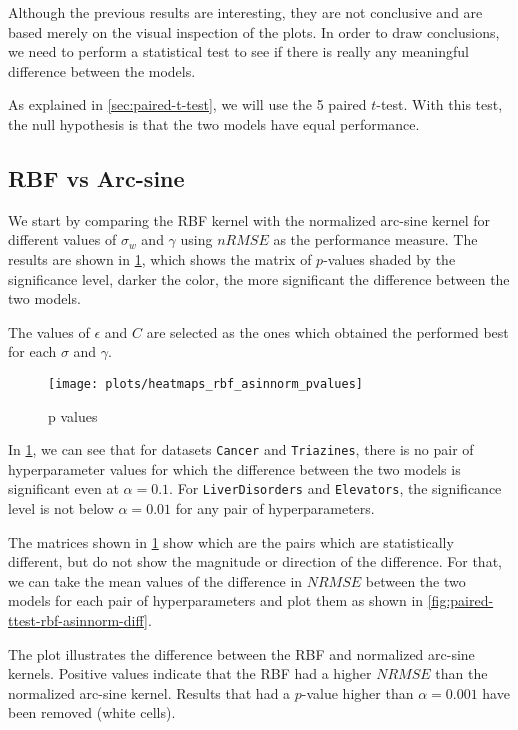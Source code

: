 Although the previous results are interesting, they are not conclusive and
are based merely on the visual inspection of the plots. In order to draw
conclusions, we need to perform a statistical test to see if there is
really any meaningful difference between the models.

As explained in \cref{sec:paired-t-test}, we will use the 5
paired $t$-test. With this test, the null hypothesis is that the two models
have equal performance.

\subsection{RBF vs Arc-sine}

We start by comparing the RBF kernel with the normalized arc-sine kernel for
different values of $\sigma_w$ and $\gamma$ using $nRMSE$ as the performance
measure. The results are shown in \cref{fig:paired-ttest-rbf-asinnorm},
which shows the matrix of $p$-values shaded by the significance level,
darker the color, the more significant the difference between the two models.

The values of $\epsilon$ and $C$ are selected as the ones which obtained
the performed best for each $\sigma$ and $\gamma$.

\begin{figure}[H]
    \texttt{[image: plots/heatmaps\_rbf\_asinnorm\_pvalues]}
    \caption{p values}
    \label{fig:paired-ttest-rbf-asinnorm}
\end{figure}

In \cref{fig:paired-ttest-rbf-asinnorm}, we can see that for datasets
\texttt{Cancer} and \texttt{Triazines}, there is no pair of hyperparameter
values for which the difference between the two models is significant even at
$\alpha=0.1$. For \texttt{LiverDisorders} and \texttt{Elevators}, the significance
level is not below $\alpha=0.01$ for any pair of hyperparameters.

The matrices shown in \cref{fig:paired-ttest-rbf-asinnorm} show which are the
pairs which are statistically different, but do not show the magnitude or
direction of the difference. For that, we can take the mean values of
the difference in $NRMSE$ between the two models for each pair of hyperparameters
and plot them as shown in \cref{fig:paired-ttest-rbf-asinnorm-diff}.

The plot illustrates the difference between the RBF and normalized arc-sine
kernels. Positive values indicate that the RBF had a higher $NRMSE$ than the
normalized arc-sine kernel. Results that had a $p$-value higher than $\alpha=0.001$
have been removed (white cells).


